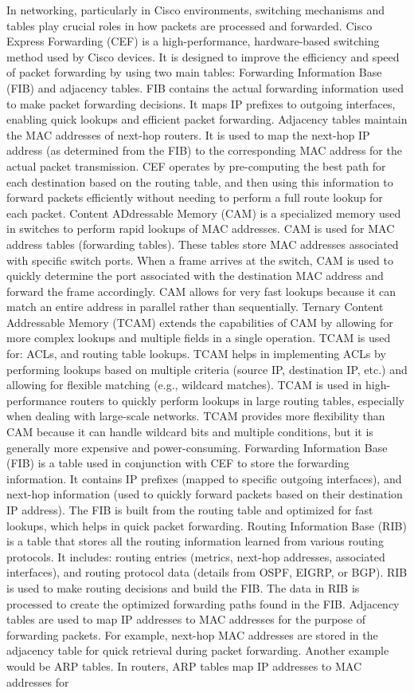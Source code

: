\documentclass{article}
\begin{document}
	In networking, particularly in Cisco environments, switching mechanisms and tables play crucial roles in how packets are processed and forwarded. Cisco Express Forwarding (CEF) is a high-performance, hardware-based switching method used by Cisco devices. It is designed to improve the efficiency and speed of packet forwarding by using two main tables: Forwarding Information Base (FIB) and adjacency tables. FIB contains the actual forwarding information used to make packet forwarding decisions. It maps IP prefixes to outgoing interfaces, enabling quick lookups and efficient packet forwarding. Adjacency tables maintain the MAC addresses of next-hop routers. It is used to map the next-hop IP address (as determined from the FIB) to the corresponding MAC address for the actual packet transmission. CEF operates by pre-computing the best path for each destination based on the routing table, and then using this information to forward packets efficiently without needing to perform a full route lookup for each packet. Content ADdressable Memory (CAM) is a specialized memory used in switches to perform rapid lookups of MAC addresses. CAM is used for MAC address tables (forwarding tables). These tables store MAC addresses associated with specific switch ports. When a frame arrives at the switch, CAM is used to quickly determine the port associated with the destination MAC address and forward the frame accordingly. CAM allows for very fast lookups because it can match an entire address in parallel rather than sequentially. Ternary Content Addressable Memory (TCAM) extends the capabilities of CAM by allowing for more complex lookups and multiple fields in a single operation. TCAM is used for: ACLs, and routing table lookups. TCAM helps in implementing ACLs by performing lookups based on multiple criteria (source IP, destination IP, etc.) and allowing for flexible matching (e.g., wildcard matches). TCAM is used in high-performance routers to quickly perform lookups in large routing tables, especially when dealing with large-scale networks. TCAM provides more flexibility than CAM because it can handle wildcard bits and multiple conditions, but it is generally more expensive and power-consuming. Forwarding Information Base (FIB) is a table used in conjunction with CEF to store the forwarding information. It contains IP prefixes (mapped to specific outgoing interfaces), and next-hop information (used to quickly forward packets based on their destination IP address). The FIB is built from the routing table and optimized for fast lookups, which helps in quick packet forwarding. Routing Information Base (RIB) is a table that stores all the routing information learned from various routing protocols. It includes: routing entries (metrics, next-hop addresses, associated interfaces), and routing protocol data (details from OSPF, EIGRP, or BGP). RIB is used to make routing decisions and build the FIB. The data in RIB is processed to create the optimized forwarding paths found in the FIB. Adjacency tables are used to map IP addresses to MAC addresses for the purpose of forwarding packets. For example, next-hop MAC addresses are stored in the adjacency table for quick retrieval during packet forwarding. Another example would be ARP tables. In routers, ARP tables map IP addresses to MAC addresses for 
\end{document}
